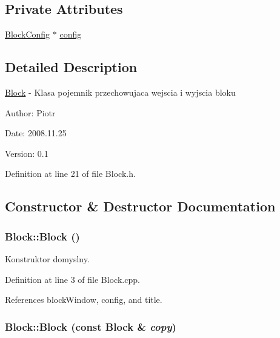 \subsection*{Private Attributes}
\begin{CompactItemize}
\item 
\hyperlink{classBlockConfig}{BlockConfig} $\ast$ \hyperlink{classBlock_0f49dcd75a7694f73558ac602b2b3d1f}{config}
\end{CompactItemize}


\subsection{Detailed Description}
\hyperlink{classBlock}{Block} - Klasa pojemnik przechowujaca wejscia i wyjscia bloku \begin{Desc}
\item[Author:]Piotr \end{Desc}
\begin{Desc}
\item[Date:]2008.11.25 \end{Desc}
\begin{Desc}
\item[Version:]0.1 \end{Desc}


Definition at line 21 of file Block.h.

\subsection{Constructor \& Destructor Documentation}
\hypertarget{classBlock_37658a946bf5067ad01d68d9ff086adc}{
\subsubsection[Block]{\setlength{\rightskip}{0pt plus 5cm}Block::Block ()}}
\label{classBlock_37658a946bf5067ad01d68d9ff086adc}


Konstruktor domyslny. 

Definition at line 3 of file Block.cpp.

References blockWindow, config, and title.\hypertarget{classBlock_eaf94aa618003b452d8b6f32d1e23766}{
\subsubsection[Block]{\setlength{\rightskip}{0pt plus 5cm}Block::Block (const {\bf Block} \& {\em copy})}}
\label{classBlock_eaf94aa618003b452d8b6f32d1e23766}


